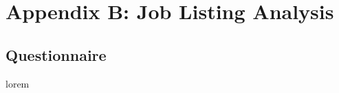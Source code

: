 \section{Appendix B: Job Listing Analysis}
\label{appendix:B}

\blindtext

\subsection{Questionnaire}
lorem


\clearpage